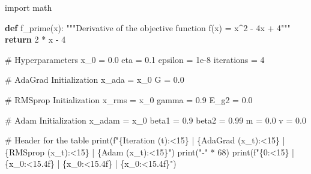 \documentclass[
  letterpaper,
  DIV=11,
  numbers=noendperiod]{scrreprt}
\newenvironment{Shaded}{\begin{snugshade}}{\end{snugshade}}
\newcommand{\BuiltInTok}[1]{\textcolor[rgb]{0.00,0.23,0.31}{#1}}
\newcommand{\CommentTok}[1]{\textcolor[rgb]{0.37,0.37,0.37}{#1}}
\newcommand{\ControlFlowTok}[1]{\textcolor[rgb]{0.00,0.23,0.31}{\textbf{#1}}}
\newcommand{\DecValTok}[1]{\textcolor[rgb]{0.68,0.00,0.00}{#1}}
\newcommand{\FloatTok}[1]{\textcolor[rgb]{0.68,0.00,0.00}{#1}}
\newcommand{\ImportTok}[1]{\textcolor[rgb]{0.00,0.46,0.62}{#1}}
\newcommand{\KeywordTok}[1]{\textcolor[rgb]{0.00,0.23,0.31}{\textbf{#1}}}
\newcommand{\NormalTok}[1]{\textcolor[rgb]{0.00,0.23,0.31}{#1}}
\newcommand{\OperatorTok}[1]{\textcolor[rgb]{0.37,0.37,0.37}{#1}}
\newcommand{\SpecialCharTok}[1]{\textcolor[rgb]{0.37,0.37,0.37}{#1}}
\newcommand{\SpecialStringTok}[1]{\textcolor[rgb]{0.13,0.47,0.30}{#1}}
\newcommand{\StringTok}[1]{\textcolor[rgb]{0.13,0.47,0.30}{#1}}
\begin{document}
\begin{Shaded}
\begin{Highlighting}[]
\ImportTok{import}\NormalTok{ math}

\KeywordTok{def}\NormalTok{ f\_prime(x):}
    \CommentTok{"""Derivative of the objective function f(x) = x\^{}2 {-} 4x + 4"""}
    \ControlFlowTok{return} \DecValTok{2} \OperatorTok{*}\NormalTok{ x }\OperatorTok{{-}} \DecValTok{4}

\CommentTok{\# Hyperparameters}
\NormalTok{x\_0 }\OperatorTok{=} \FloatTok{0.0}
\NormalTok{eta }\OperatorTok{=} \FloatTok{0.1}
\NormalTok{epsilon }\OperatorTok{=} \FloatTok{1e{-}8}
\NormalTok{iterations }\OperatorTok{=} \DecValTok{4}

\CommentTok{\# AdaGrad Initialization}
\NormalTok{x\_ada }\OperatorTok{=}\NormalTok{ x\_0}
\NormalTok{G }\OperatorTok{=} \FloatTok{0.0}

\CommentTok{\# RMSprop Initialization}
\NormalTok{x\_rms }\OperatorTok{=}\NormalTok{ x\_0}
\NormalTok{gamma }\OperatorTok{=} \FloatTok{0.9}
\NormalTok{E\_g2 }\OperatorTok{=} \FloatTok{0.0}

\CommentTok{\# Adam Initialization}
\NormalTok{x\_adam }\OperatorTok{=}\NormalTok{ x\_0}
\NormalTok{beta1 }\OperatorTok{=} \FloatTok{0.9}
\NormalTok{beta2 }\OperatorTok{=} \FloatTok{0.99}
\NormalTok{m }\OperatorTok{=} \FloatTok{0.0}
\NormalTok{v }\OperatorTok{=} \FloatTok{0.0}

\CommentTok{\# Header for the table}
\BuiltInTok{print}\NormalTok{(}\SpecialStringTok{f"}\SpecialCharTok{\{}\StringTok{\textquotesingle{}Iteration (t)\textquotesingle{}}\SpecialCharTok{:\textless{}15\}}\SpecialStringTok{ | }\SpecialCharTok{\{}\StringTok{\textquotesingle{}AdaGrad (x\_t)\textquotesingle{}}\SpecialCharTok{:\textless{}15\}}\SpecialStringTok{ | }\SpecialCharTok{\{}\StringTok{\textquotesingle{}RMSprop (x\_t)\textquotesingle{}}\SpecialCharTok{:\textless{}15\}}\SpecialStringTok{ | }\SpecialCharTok{\{}\StringTok{\textquotesingle{}Adam (x\_t)\textquotesingle{}}\SpecialCharTok{:\textless{}15\}}\SpecialStringTok{"}\NormalTok{)}
\BuiltInTok{print}\NormalTok{(}\StringTok{"{-}"} \OperatorTok{*} \DecValTok{68}\NormalTok{)}
\BuiltInTok{print}\NormalTok{(}\SpecialStringTok{f"}\SpecialCharTok{\{}\DecValTok{0}\SpecialCharTok{:\textless{}15\}}\SpecialStringTok{ | }\SpecialCharTok{\{}\NormalTok{x\_0}\SpecialCharTok{:\textless{}15.4f\}}\SpecialStringTok{ | }\SpecialCharTok{\{}\NormalTok{x\_0}\SpecialCharTok{:\textless{}15.4f\}}\SpecialStringTok{ | }\SpecialCharTok{\{}\NormalTok{x\_0}\SpecialCharTok{:\textless{}15.4f\}}\SpecialStringTok{"}\NormalTok{)}


\end{Highlighting}
\end{Shaded}
\end{document}
